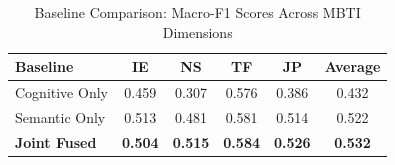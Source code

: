 \begin{table}[h]
\centering
\caption{Baseline Comparison: Macro-F1 Scores Across MBTI Dimensions}
\label{tab:baseline_comparison}
\begin{tabular}{lcccc|c}
\hline
Baseline & IE & NS & TF & JP & Average \\
\hline
Cognitive Only & 0.459 & 0.307 & 0.576 & 0.386 & 0.432 \\
Semantic Only & 0.513 & 0.481 & 0.581 & 0.514 & 0.522 \\
\textbf{Joint Fused} & \textbf{0.504} & \textbf{0.515} & \textbf{0.584} & \textbf{0.526} & \textbf{0.532} \\
\hline
\end{tabular}
\end{table}
